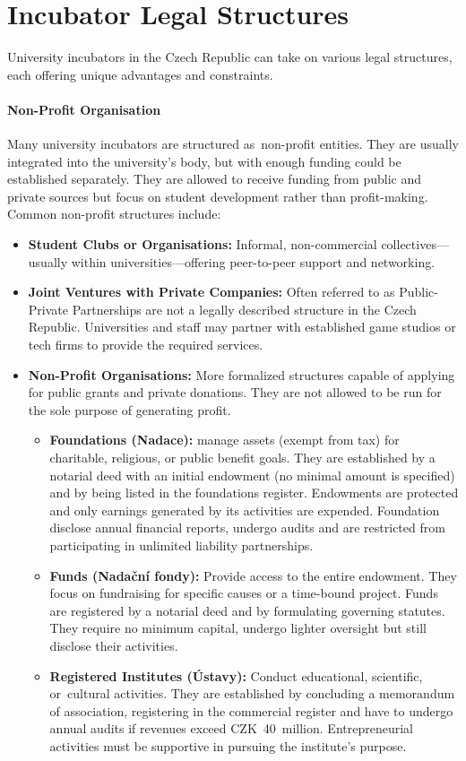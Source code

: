 \section{Incubator Legal Structures}
University incubators in the Czech Republic can take on various legal structures, each offering unique advantages and constraints.

\paragraph{Non-Profit Organisation}
Many university incubators are structured as~non-profit entities. They are usually integrated into the university's body, but with enough funding could be established separately. They are allowed to receive funding from public and private sources but focus on student development rather than profit-making. Common non-profit structures include:
\begin{itemize}
    \item \textbf{Student Clubs or Organisations:} Informal, non-commercial collectives---usually within universities---offering peer-to-peer support and networking. \cite{lily-NONPROFIT}
    \item \textbf{Joint Ventures with Private Companies:} Often referred to as Public-Private Partnerships are not a legally described structure in the Czech Republic. Universities and staff may partner with established game studios or tech firms to provide the required services. \cite{lily-NONPROFIT}
    \item \textbf{Non-Profit Organisations:} More formalized structures capable of applying for public grants and private donations. They are not allowed to be run for the sole purpose of generating profit. \cite{lily-NONPROFIT}
    \begin{itemize}
        \item \textbf{Foundations (Nadace):} manage assets (exempt from tax) for charitable, religious, or public benefit goals. They are established by a notarial deed with an initial endowment (no minimal amount is specified) and by being listed in the foundations register. Endowments are protected and only earnings generated by its activities are expended. Foundation disclose annual financial reports, undergo audits and are restricted from participating in unlimited liability partnerships.
        \item \textbf{Funds (Nadační fondy):} Provide access to the entire endowment. They focus on fundraising for specific causes or a time-bound project. Funds are registered by a notarial deed and by formulating governing statutes. They require no minimum capital, undergo lighter oversight but still disclose their activities.
        \item \textbf{Registered Institutes (Ústavy):} Conduct educational, scientific, or~cultural activities. They are established by concluding a memorandum of association, registering in the commercial register and have to undergo annual audits if revenues exceed CZK~40~million. Entrepreneurial activities must be supportive in pursuing the institute’s purpose.
    \end{itemize}
\end{itemize}

